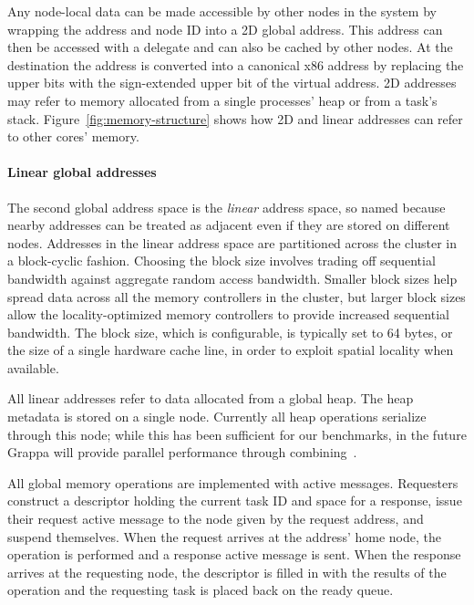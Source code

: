 Any node-local data can be made accessible by other nodes in the system
by wrapping the address and node ID into a 2D global address. This
address can then be accessed with a delegate and can also be cached by
other nodes. At the destination the address is converted into a
canonical x86 address by replacing the upper bits with the sign-extended
upper bit of the virtual address. 2D addresses may refer to memory
allocated from a single processes' heap or from a task's stack.
Figure~\ref{fig:memory-structure} shows how 2D and linear addresses can
refer to other cores' memory.

\paragraph{Linear global addresses} The second global address space is
the {\em linear} address space, so named because nearby addresses can be
treated as adjacent even if they are stored on different nodes.
Addresses in the linear address space are partitioned across the cluster
in a block-cyclic fashion. Choosing the block size involves trading off
sequential bandwidth against aggregate random access bandwidth. Smaller
block sizes help spread data across all the memory controllers in the
cluster, but larger block sizes allow the locality-optimized memory
controllers to provide increased sequential bandwidth. The block size,
which is configurable, is typically set to 64 bytes, or the size of a
single hardware cache line, in order to exploit spatial locality when
available. 

All linear addresses refer to data allocated from a global heap. The
heap metadata is stored on a single node. Currently all heap operations
serialize through this node; while this has been sufficient for our
benchmarks, in the future Grappa will provide parallel performance
through combining~\cite{MAMA,flatcombining}.


All global memory operations are implemented with active messages.
Requesters construct a descriptor holding the current task ID and space
for a response, issue their request active message to the node given by
the request address, and suspend themselves. When the request arrives at
the address' home node, the operation is performed and a response active
message is sent. When the response arrives at the requesting node, the
descriptor is filled in with the results of the operation and the
requesting task is placed back on the ready queue.


